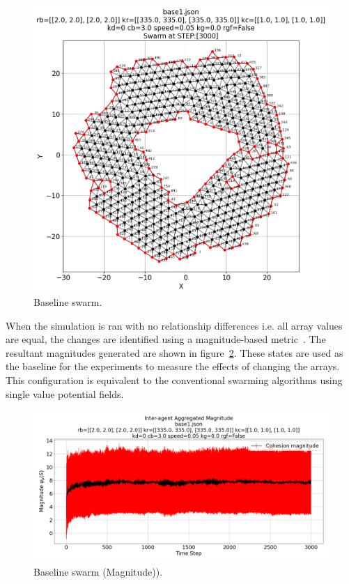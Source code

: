 \documentclass[12pt,a4paper]{IEEEtran}
\begin{document}
\begin{figure}[H]
	\begin{center}
		\includegraphics[width=1.0\linewidth]{figures/baseline}
	\end{center}
	\caption{Baseline swarm. \label{fig:baselineSwarm}}
\end{figure}

When the simulation is ran with no relationship differences i.e. all array values are equal, the changes are identified using a magnitude-based metric~\cite{eliot2018metric}. The resultant magnitudes generated are shown in figure~\ref{fig:baselineMagnitude}. These states are used as the baseline for the experiments to measure the effects of changing the arrays. This configuration is equivalent to the conventional swarming algorithms using single value potential fields.

\begin{figure}[H]
	\begin{center}
		\includegraphics[width=1.0\linewidth]{figures/baselineMagnitude}
	\end{center}
	\caption{Baseline swarm (Magnitude)). \label{fig:baselineMagnitude}}
\end{figure}
\end{document}
